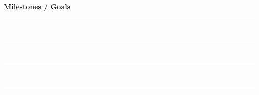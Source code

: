 \documentclass[10pt,letterpaper]{article}
\begin{document}
\begin{paracol}{2}
\begin{tcolorbox}[sheetbox,title=\textbf{Advancement \& Notes}]
\textbf{Milestones / Goals}\\[-6pt]
\rule{\columnwidth}{0.4pt}\\[-4pt]
\rule{\columnwidth}{0.4pt}\\[-4pt]
\rule{\columnwidth}{0.4pt}\\[-4pt]
\rule{\columnwidth}{0.4pt}
\end{tcolorbox}

\end{paracol}
\end{document}
